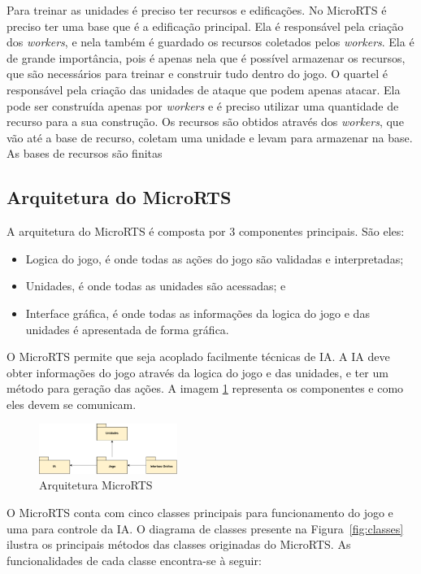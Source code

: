 Para treinar as unidades é preciso ter recursos e edificações. No MicroRTS é preciso ter uma base que é a edificação principal. Ela é responsável pela criação dos \textit{workers}, e nela também é guardado os recursos coletados pelos \textit{workers}. Ela é de grande importância, pois é apenas nela que é possível armazenar os recursos, que são necessários para treinar e construir tudo dentro do jogo. O quartel é responsável pela criação das unidades de ataque que podem apenas atacar. Ela pode ser construída apenas por \textit{workers} e é preciso utilizar uma quantidade de recurso para a sua construção. Os recursos são obtidos através dos \textit{workers}, que vão até a base de recurso, coletam uma unidade e levam para armazenar na base. As bases de recursos são finitas

\subsection{Arquitetura do MicroRTS}

A arquitetura do MicroRTS é composta por 3 componentes principais. São eles:

\begin{itemize}
	\item Logica do jogo, é onde todas as ações do jogo são validadas e interpretadas;
	\item Unidades, é onde todas as unidades são acessadas; e
	\item Interface gráfica, é onde todas as informações da logica do jogo e das unidades é apresentada de forma gráfica.
\end{itemize}

O MicroRTS permite que seja acoplado facilmente técnicas de IA. A IA deve obter informações do jogo através da logica do jogo e das unidades, e ter um método para geração das ações. A imagem \ref{fig:pacotes} representa os componentes e como eles devem se comunicam.

\begin{figure}[ht]
	\centering
	\includegraphics[width=0.4\textwidth]{fig/pacotes.pdf}
	\caption{Arquitetura MicroRTS}
	\label{fig:pacotes}
\end{figure}

O MicroRTS conta com cinco classes principais para funcionamento do jogo e uma para controle da IA. O diagrama de classes presente na Figura~\ref{fig:classes} ilustra os principais métodos das classes originadas do MicroRTS. As funcionalidades de cada classe encontra-se à seguir: 

